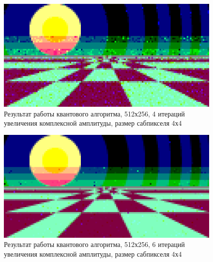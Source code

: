 \begin{figure}[H]
	\begin{center}
		\includegraphics[scale=0.96]{img/prog_res/qss-512-4.png}
	\end{center}
	\captionsetup{justification=centering}
	\caption{Результат работы квантового алгоритма, 512х256, 4 итераций увеличения комплексной амплитуды, размер сабпикселя 4х4}
	\label{img:example_01}
\end{figure}

\begin{figure}[H]
	\begin{center}
		\includegraphics[scale=0.96]{img/prog_res/qss-512-6.png}
	\end{center}
	\captionsetup{justification=centering}
	\caption{Результат работы квантового алгоритма, 512х256, 6 итераций увеличения комплексной амплитуды, размер сабпикселя 4х4}
	\label{img:example_02}
\end{figure}

